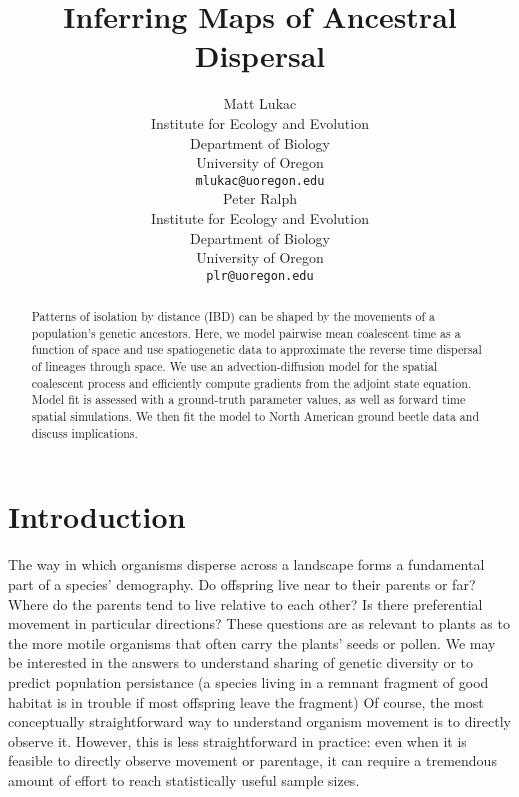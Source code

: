 \documentclass{article}
\title{Inferring Maps of Ancestral Dispersal}
\author{{Matt Lukac} \\
Institute for Ecology and Evolution\\
Department of Biology\\
University of Oregon\\
\texttt{mlukac@uoregon.edu} \\
\And
{Peter Ralph} \\
Institute for Ecology and Evolution\\
Department of Biology\\
University of Oregon\\
\texttt{plr@uoregon.edu} \\
}
\begin{document}
\maketitle

\begin{abstract}
	Patterns of isolation by distance (IBD) can be shaped by
	the movements of a population's genetic ancestors.
	Here, we model pairwise mean coalescent time as a function of space
	and use spatiogenetic data to approximate the reverse time
	dispersal of lineages through space.
	We use an advection-diffusion model for the spatial coalescent process
	and efficiently compute gradients from the adjoint state equation.
	Model fit is assessed with a ground-truth parameter values,
	as well as forward time spatial simulations.
	We then fit the model to North American ground beetle data
	and discuss implications.
\end{abstract}




\section{Introduction}


The way in which organisms disperse across a landscape
forms a fundamental part of a species' demography.
Do offspring live near to their parents or far?
Where do the parents tend to live relative to each other?
Is there preferential movement in particular directions?
These questions are as relevant to plants as to the more motile organisms
that often carry the plants' seeds or pollen.
We may be interested in the answers to understand
sharing of genetic diversity
or to predict population persistance
(a species living in a remnant fragment of good habitat
is in trouble if most offspring leave the fragment)
Of course, the most conceptually straightforward way to understand organism movement
is to directly observe it.
However, this is less straightforward in practice:
even when it is feasible to directly observe movement or parentage,
it can require a tremendous amount of effort to reach statistically useful sample sizes.
\end{document}
